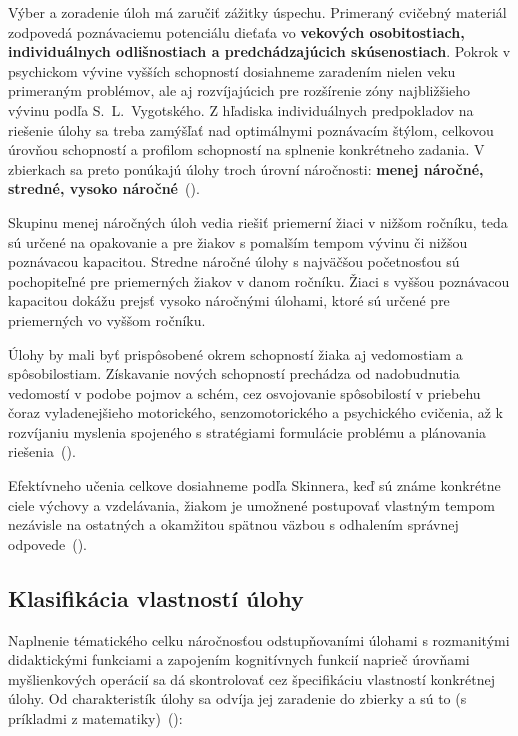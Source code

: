 Výber a zoradenie úloh má zaručiť zážitky úspechu. Primeraný cvičebný materiál zodpovedá poznávaciemu potenciálu dieťaťa vo \textbf{vekových osobitostiach, individuálnych odlišnostiach a predchádzajúcich skúsenostiach}. Pokrok v psychickom vývine vyšších schopností dosiahneme zaradením nielen veku primeraným problémov, ale aj rozvíjajúcich pre rozšírenie zóny najbližšieho vývinu podľa S.~L.~Vygotského. Z hľadiska individuálnych predpokladov na riešenie úlohy sa treba zamýšľať nad optimálnymi poznávacím štýlom, celkovou úrovňou schopností a profilom schopností na splnenie konkrétneho zadania. V zbierkach sa preto ponúkajú úlohy troch úrovní náročnosti: \textbf{menej náročné, stredné, vysoko náročné}~(\cite{pavlovkin_ziak_1989}).
 
Skupinu menej náročných úloh vedia riešiť priemerní žiaci v nižšom ročníku, teda sú určené na opakovanie a pre žiakov s pomalším tempom vývinu či nižšou poznávacou kapacitou. Stredne náročné úlohy s najväčšou početnosťou sú pochopiteľné pre priemerných žiakov v danom ročníku. Žiaci s vyššou poznávacou kapacitou dokážu prejsť vysoko náročnými úlohami, ktoré sú určené pre priemerných vo vyššom ročníku.
 
Úlohy by mali byť prispôsobené okrem schopností žiaka aj vedomostiam a spôsobilostiam. Získavanie nových schopností prechádza od nadobudnutia vedomostí v podobe pojmov a schém, cez osvojovanie spôsobilostí v priebehu čoraz vyladenejšieho motorického, senzomotorického a psychického cvičenia, až k rozvíjaniu myslenia spojeného s stratégiami formulácie problému a plánovania riešenia~(\cite{pavlovkin_ziak_1989}).

Efektívneho učenia celkove dosiahneme podľa Skinnera, keď sú známe konkrétne ciele výchovy a vzdelávania, žiakom je umožnené postupovať vlastným tempom nezávisle na ostatných a okamžitou spätnou väzbou s odhalením správnej odpovede~(\cite{pavlovkin_ziak_1989}).


\subsection{Klasifikácia vlastností úlohy} \label{sec:klasifikacia-ulohy}
Naplnenie tématického celku náročnosťou odstupňovaními úlohami s rozmanitými didaktickými funkciami a zapojením kognitívnych funkcií naprieč úrovňami myšlienkových operácií sa dá skontrolovať cez špecifikáciu vlastností konkrétnej úlohy. Od charakteristík úlohy sa odvíja  jej zaradenie do zbierky a sú to (s príkladmi z matematiky)~(\cite{mindakova_tvorba_2008}):


